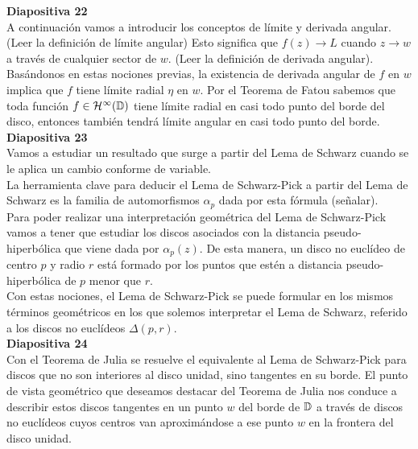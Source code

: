 \documentclass[spanish, a4paper, 12pt]{article}
\begin{document}
\textbf{Diapositiva 22} \\

A continuación vamos a introducir los conceptos de límite y derivada angular. (Leer la definición de límite angular) Esto significa que $f(z) \to L$ cuando $z \to w$ a través de cualquier sector de $w$.  (Leer la definición de derivada angular). Basándonos en estas nociones previas, la existencia de derivada angular de $f$ en $w$ implica que $f$ tiene límite radial $\eta$ en $w$. Por el Teorema de Fatou sabemos que toda función $f \in \mathcal{H}^{\infty}(\mathbb{D})$ tiene límite radial en casi todo punto del borde del disco, entonces también tendrá límite angular en casi todo punto del borde. \\

\textbf{Diapositiva 23} \\

Vamos a estudiar un resultado que surge a partir del Lema de Schwarz cuando se le aplica un cambio conforme de variable. \\

La herramienta clave para deducir el Lema de Schwarz-Pick a partir del Lema de Schwarz es la familia de automorfismos $\alpha_p$ dada por esta fórmula (señalar). \\

Para poder realizar una interpretación geométrica del Lema de Schwarz-Pick vamos a tener que estudiar los discos asociados con la distancia pseudo-hiperbólica que viene dada por $\alpha_p(z)$. De esta manera, un disco no euclídeo de centro $p$ y radio $r$ está formado por los puntos que estén a distancia pseudo-hiperbólica de $p$ menor que $r$. \\

Con estas nociones, el Lema de Schwarz-Pick se puede formular en los mismos términos geométricos en los que solemos interpretar el Lema de Schwarz, referido a los discos no euclídeos $\Delta(p,r)$. \\

\textbf{Diapositiva 24} \\

Con el Teorema de Julia se resuelve el equivalente al Lema de Schwarz-Pick para discos que no son interiores al disco unidad, sino tangentes en su borde. El punto de vista geométrico que deseamos destacar del Teorema de Julia nos conduce a describir estos discos tangentes en un punto $w$ del borde de $\mathbb{D}$ a través de discos no euclídeos cuyos centros van aproximándose a ese punto $w$ en la frontera del disco unidad. \\
\end{document}
